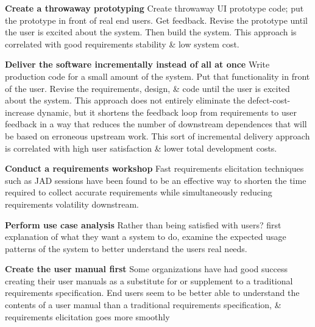 \documentclass{report}
\begin{document}
\noindent\textbf{Create a throwaway prototyping}\newline
Create throwaway UI prototype code; put the prototype in front of real end users. Get feedback. Revise the prototype until the user is excited about the system. Then build the system. This approach is correlated with good requirements stability \& low system cost.\newline

\noindent\textbf{Deliver the software incrementally instead of all at once}\newline
Write production code for a small amount of the system. Put that functionality in front of the user. Revise the requirements, design, \& code until the user is excited about the system. This approach does not entirely eliminate the defect-cost-increase dynamic, but it shortens the feedback loop from requirements to user feedback in a way that reduces the number of downstream dependences that will be based on erroneous upstream work. This sort of incremental delivery approach is correlated with high user satisfaction \& lower total development costs.\newline

\noindent\textbf{Conduct a requirements workshop}\newline
Fast requirements elicitation techniques such as JAD sessions have been found to be an effective way to shorten the time required to collect accurate requirements while simultaneously reducing requirements volatility downstream.\newline

\noindent\textbf{Perform use case analysis}\newline
Rather than being satisfied with users? first explanation of what they want a system to do, examine the expected usage patterns of the system to better understand the users real needs.\newline

\noindent\textbf{Create the user manual first}\newline
Some organizations have had good success creating their user manuals as a substitute for or supplement to a traditional requirements specification. End users seem to be better able to understand the contents of a user manual than a traditional requirements specification, \& requirements elicitation goes more smoothly


\renewcommand\thechapter{A2}
\end{document}
